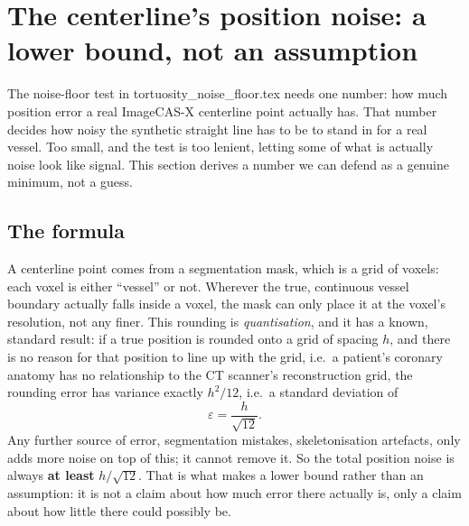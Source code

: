 %

\section*{The centerline's position noise: a lower bound, not an assumption}

The noise-floor test in tortuosity\_noise\_floor.tex needs one number: how much position error a
real ImageCAS-X centerline point actually has. That number decides how noisy the synthetic
straight line has to be to stand in for a real vessel. Too small, and the test is too lenient,
letting some of what is actually noise look like signal. This section derives a number we can
defend as a genuine minimum, not a guess.

\subsection*{The formula}

A centerline point comes from a segmentation mask, which is a grid of voxels: each voxel is
either ``vessel'' or not. Wherever the true, continuous vessel boundary actually falls inside a
voxel, the mask can only place it at the voxel's resolution, not any finer. This rounding is
\emph{quantisation}, and it has a known, standard result: if a true position is rounded onto a
grid of spacing $h$, and there is no reason for that position to line up with the grid, i.e.\ a
patient's coronary anatomy has no relationship to the CT scanner's reconstruction grid, the
rounding error has variance exactly $h^2/12$, i.e.\ a standard deviation of
\begin{equation}
  \varepsilon = \frac{h}{\sqrt{12}}.
  \label{eq:week3-quant-floor}
\end{equation}
Any further source of error, segmentation mistakes, skeletonisation artefacts, only adds more
noise on top of this; it cannot remove it. So the total position noise is always
\textbf{at least} $h/\sqrt{12}$. That is what makes  a lower bound
rather than an assumption: it is not a claim about how much error there actually is, only a
claim about how little there could possibly be.

